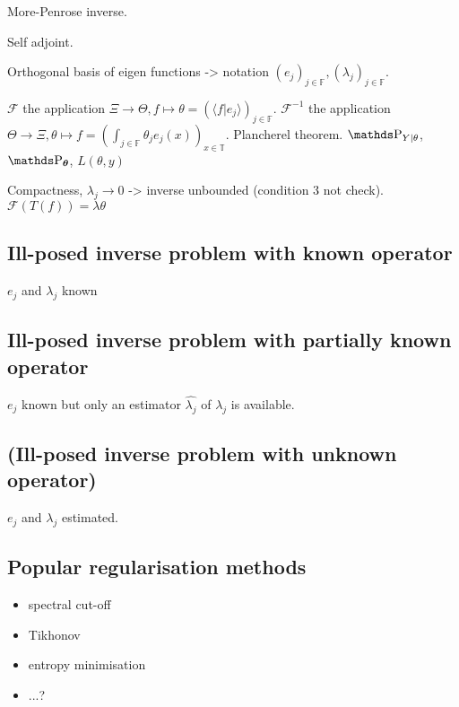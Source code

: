 More-Penrose inverse.

Self adjoint.

Orthogonal basis of eigen functions  -> notation $(e_{j})_{j \in \mathds{F}}, \left(\lambda_{j}\right)_{j \in \mathds{F}}$.

$\mathcal{F}$ the application $\Xi \rightarrow \Theta, f \mapsto \theta = (\langle f \vert e_{j} \rangle)_{j \in \mathds{F}}$.
$\mathcal{F}^{-1}$ the application $\Theta \rightarrow \Xi, \theta \mapsto f = (\int_{j \in \mathds{F}} \theta_{j} e_{j}(x))_{x \in \mathds{T}}$.
Plancherel theorem.
$\P_{Y \vert \theta}$, $\P_{\boldsymbol{\theta}}$, $L(\theta, y)$

Compactness, $\lambda_{j} \rightarrow 0$ -> inverse unbounded (condition 3 not check).
$\mathcal{F}(T(f)) = \lambda \theta$

\subsection{Ill-posed inverse problem with known operator}\label{1.1.3}
$e_{j}$ and $\lambda_{j}$ known

\subsection{Ill-posed inverse problem with partially known operator}\label{1.1.4}
$e_{j}$ known but only an estimator $\widehat{\lambda_{j}}$ of $\lambda_{j}$ is available.

\subsection{(Ill-posed inverse problem with unknown operator)}\label{1.1.5}
$e_{j}$ and $\lambda_{j}$ estimated.

\subsection{Popular regularisation methods}\label{1.1.8}
\begin{itemize}
\item spectral cut-off
\item Tikhonov
\item entropy minimisation
\item ...?
\end{itemize}